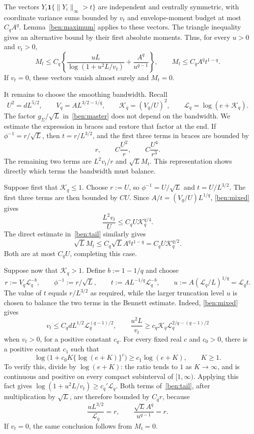 \documentclass[11pt,letterpaper,twoside,leqno]{article}
\theoremstyle{bookplain}
\theoremstyle{bookremark}
\newcommand{\ind}{\mathbf 1}
\begin{document}
The vectors $Y_i\ind\{\|Y_i\|_\infty>t\}$ are independent
and centrally symmetric, with coordinate variance sums bounded
by $v_t$ and envelope-moment budget at most $C_qA^q$.
Lemma~\ref{ben:maximum} applies to these vectors. The triangle
inequality gives an alternative bound by their first absolute
moments. Thus, for every $u>0$ and $v_t>0$,
\begin{equation}
 M_t\le C_q\left\{\frac{uL}{\log(1+u^2L/v_t)}
                      +\frac{A^q}{u^{q-1}}\right\},
 \qquad M_t\le C_qA^qt^{1-q}.
 \label{ben:tail}
\end{equation}
If $v_t=0$, these vectors vanish almost surely and $M_t=0$.

It remains to choose the smoothing bandwidth. Recall
\[
 U^2=dL^{5/2},\qquad V_q=AL^{3/2-1/q},\qquad
 \mathcal K_q=(V_q/U)^2,\qquad
 \mathcal L_q=\log(e+\mathcal K_q).
\]
The factor $g_\Sigma/\sqrt L$ in~\eqref{ben:master} does not
depend on the bandwidth. We estimate the expression in braces
and restore that factor at the end. If
$\phi^{-1}=r/\sqrt L$, then $t=r/L^{3/2}$, and the first
three terms in braces are bounded by
\[
 r,\qquad C\frac{U^2}{r},\qquad C\frac{U^4}{r^3}.
\]
The remaining two terms are $L^2v_t/r$ and $\sqrt L M_t$.
This representation shows directly which terms the bandwidth
must balance.

Suppose first that $\mathcal K_q\le1$. Choose $r:=U$, so
$\phi^{-1}=U/\sqrt L$ and $t=U/L^{3/2}$. The first three
terms are then bounded by $CU$. Since
$A/t=(V_q/U)L^{1/q}$, \eqref{ben:mixed} gives
\[
 \frac{L^2v_t}{U}\le C_qU\mathcal K_q^{q/4}.
\]
The direct estimate in~\eqref{ben:tail} similarly gives
\[
 \sqrt L M_t\le C_q\sqrt L A^qt^{1-q}
                 =C_qU\mathcal K_q^{q/2}.
\]
Both are at most $C_qU$, completing this case.

Suppose now that $\mathcal K_q>1$. Define $b:=1-1/q$ and choose
\[
 r:=V_q\mathcal L_q^{-b},\qquad
 \phi^{-1}:=r/\sqrt L,\qquad
 t:=AL^{-1/q}\mathcal L_q^{-b},\qquad
 u:=A(\mathcal L_q/L)^{1/q}=\mathcal L_q t.
\]
The value of $t$ equals $r/L^{3/2}$ as required, while the
larger truncation level $u$ is chosen to balance the two terms
in the Bennett estimate. Indeed, \eqref{ben:mixed} gives
\[
 v_t\le C_qdL^{1/2}\mathcal L_q^{(q-1)/2},\qquad
 \frac{u^2L}{v_t}
 \ge c_q\mathcal K_q\mathcal L_q^{2/q-(q-1)/2}
\]
when $v_t>0$, for a positive constant $c_q$.
For every fixed real $c$ and $c_0>0$, there is a positive
constant $c_1$ such that
\[
 \log\bigl(1+c_0K\{\log(e+K)\}^c\bigr)
 \ge c_1\log(e+K),\qquad K\ge1.
\]
To verify this, divide by $\log(e+K)$: the ratio tends to $1$
as $K\to\infty$, and is continuous and positive on every
compact subinterval of $[1,\infty)$. Applying this fact gives
$\log(1+u^2L/v_t)\ge c_q'\mathcal L_q$.
Both terms of~\eqref{ben:tail}, after multiplication by
$\sqrt L$, are therefore bounded by $C_qr$, because
\[
 \frac{uL^{3/2}}{\mathcal L_q}=r,
 \qquad \frac{\sqrt L A^q}{u^{q-1}}=r.
\]
If $v_t=0$, the same conclusion follows from $M_t=0$.
\end{document}
